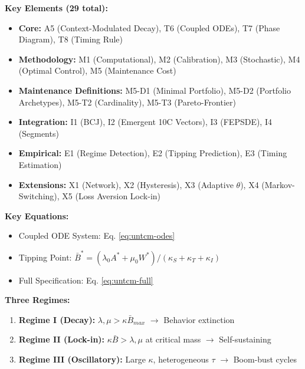 \begin{tcolorbox}[colback=gray!5!white,colframe=gray!75!black,title=Quick Reference]
\textbf{Key Elements (29 total):}
\begin{itemize}[nosep]
    \item \textbf{Core:} A5 (Context-Modulated Decay), T6 (Coupled ODEs), T7 (Phase Diagram), T8 (Timing Rule)
    \item \textbf{Methodology:} M1 (Computational), M2 (Calibration), M3 (Stochastic), M4 (Optimal Control), M5 (Maintenance Cost)
    \item \textbf{Maintenance Definitions:} M5-D1 (Minimal Portfolio), M5-D2 (Portfolio Archetypes), M5-T2 (Cardinality), M5-T3 (Pareto-Frontier)
    \item \textbf{Integration:} I1 (BCJ), I2 (Emergent 10C Vectors), I3 (FEPSDE), I4 (Segments)
    \item \textbf{Empirical:} E1 (Regime Detection), E2 (Tipping Prediction), E3 (Timing Estimation)
    \item \textbf{Extensions:} X1 (Network), X2 (Hysteresis), X3 (Adaptive $\theta$), X4 (Markov-Switching), X5 (Loss Aversion Lock-in)
\end{itemize}

\textbf{Key Equations:}
\begin{itemize}[nosep]
    \item Coupled ODE System: Eq. \ref{eq:untcm-odes}
    \item Tipping Point: $\bar{B}^* = (\lambda_0 A^* + \mu_0 W^*)/(\kappa_S + \kappa_T + \kappa_I)$
    \item Full Specification: Eq. \ref{eq:untcm-full}
\end{itemize}

\textbf{Three Regimes:}
\begin{enumerate}[nosep]
    \item \textbf{Regime I (Decay):} $\lambda, \mu > \kappa \bar{B}_{max}$ $\rightarrow$ Behavior extinction
    \item \textbf{Regime II (Lock-in):} $\kappa \bar{B} > \lambda, \mu$ at critical mass $\rightarrow$ Self-sustaining
    \item \textbf{Regime III (Oscillatory):} Large $\kappa$, heterogeneous $\tau$ $\rightarrow$ Boom-bust cycles
\end{enumerate}
\end{tcolorbox}


